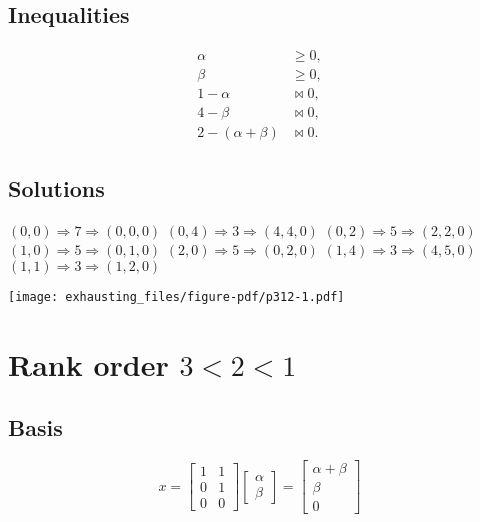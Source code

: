 \documentclass[
  12pt,
  letterpaper,
  DIV=11,
  numbers=noendperiod]{scrartcl}
\begin{document}
\subsection{Inequalities}\label{inequalities-4}

\begin{align}
\alpha&\geq 0,\\
\beta&\geq 0,\\
1-\alpha&\bowtie 0,\\
4-\beta&\bowtie 0,\\
2-(\alpha+\beta)&\bowtie 0.
\end{align}

\subsection{Solutions}\label{solutions-4}

\((0,0)\Rightarrow 7\Rightarrow(0,0,0)\)\newline
\((0,4)\Rightarrow 3\Rightarrow(4,4,0)\)\newline
\((0,2)\Rightarrow 5\Rightarrow(2,2,0)\)\newline
\((1,0)\Rightarrow 5\Rightarrow(0,1,0)\)\newline
\((2,0)\Rightarrow 5\Rightarrow(0,2,0)\)\newline
\((1,4)\Rightarrow 3\Rightarrow(4,5,0)\)\newline
\((1,1)\Rightarrow 3\Rightarrow(1,2,0)\)\newline

\begin{center}
\texttt{[image: exhausting\_files/figure-pdf/p312-1.pdf]}
\end{center}

\pagebreak

\section{\texorpdfstring{Rank order
\(3<2<1\)}{Rank order 3\textless2\textless1}}\label{rank-order-321}

\subsection{Basis}\label{basis-5}

\[
x=\begin{bmatrix}
1&1\\
0&1\\
0&0
\end{bmatrix}
\begin{bmatrix}
\alpha\\
\beta
\end{bmatrix}=
\begin{bmatrix}
\alpha+\beta\\
\beta\\
0
\end{bmatrix}
\]
\end{document}
